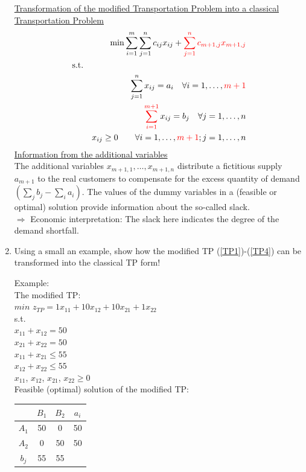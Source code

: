 \begin{enumerate}
\begin{solution}
		\uline{Transformation of the modified Transportation Problem into a classical Transportation Problem}
		\begin{eqnarray}\setcounter{equation}{5}
			&&\min \sum_{i=1}^m\sum_{j=1}^n c_{ij} x_{ij}\phantom{+\red{\sum_{j=1}^n c_{m+1,j}x_{m+1,j}}} \\
			\mbox{s.t.}&& \nonumber \\
			&&\sum_{j=1}^n x_{ij} = a_i \quad \forall i=1,\ldots,\phantom{\red{m+1}} \\
			&&\sum_{i=1}^\red{\phantom{m+1}} x_{ij} = b_j \quad \forall j=1,\ldots,n \\
			&&x_{ij} \geq 0\qquad \forall i=1,\ldots,\phantom{\red{m+1}}; j=1,\ldots,n \\
	\end{eqnarray}
	\uline{Information from the additional variables}\\
	The additional variables $x_{m+1,1},\ldots, x_{m+1,n}$ distribute a fictitious supply $a_{m+1}$ to the real customers to compensate for the excess quantity of demand $\left(\sum_j b_j-\sum_i a_i\right)$.
	The values of the dummy variables in a (feasible or optimal) solution provide information about the so-called slack.\\
	$\Rightarrow$ Economic interpretation: The slack here indicates the degree of the demand shortfall.
	\end{solution}
	\item \label{6} Using a small an example, show how the modified TP (\ref{TP1})-(\ref{TP4}) can be transformed into the classical TP form!
	\begin{solution}
		Example:\\
		The modified TP:\\
				$min$ $z_{TP}= 1x_{11}+10x_{12}+10x_{21}+1x_{22}$\\
				s.t.\\
				$x_{11}+x_{12}=50$\\
				$x_{21}+x_{22}=50$\\
				
				$x_{11}+x_{21}\leq 55$\\
				$x_{12}+x_{22}\leq 55$\\
				
				$x_{11}$, $x_{12}$, $x_{21}$, $x_{22}\geq0$\\
				
		Feasible (optimal) solution of the modified TP:\\
		\begin{tabular}{c|cc|c}
		&$B_1$&$B_2$&$a_i$\\
		\hline
		$A_1$&50&0&50\\
		$A_2$&0&50&50\\
		\hline
		$b_j$&55&55&\\
		\end{tabular}
		

\end{solution}
\end{enumerate}
